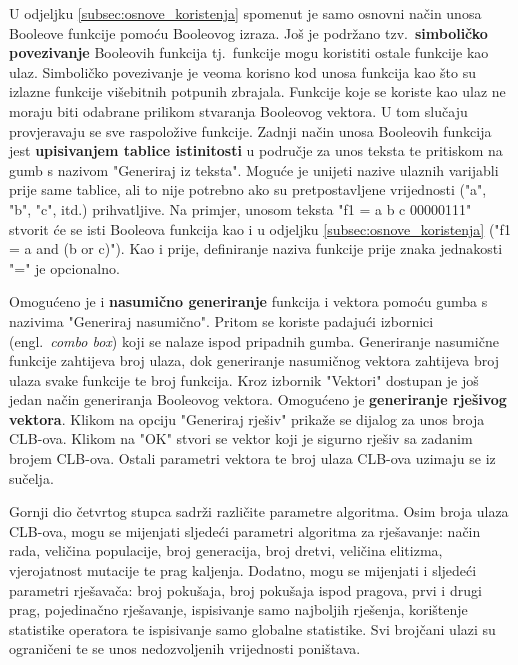 \documentclass[times, utf8, diplomski]{fer}
\begin{document}
U odjeljku \ref{subsec:osnove_koristenja} spomenut je samo osnovni način unosa Booleove funkcije pomoću Booleovog izraza. Još je podržano tzv.~\textbf{simboličko povezivanje} Booleovih funkcija tj.~funkcije mogu koristiti ostale funkcije kao ulaz. Simboličko povezivanje je veoma korisno kod unosa funkcija kao što su izlazne funkcije višebitnih potpunih zbrajala. Funkcije koje se koriste kao ulaz ne moraju biti odabrane prilikom stvaranja Booleovog vektora. U tom slučaju provjeravaju se sve raspoložive funkcije. Zadnji način unosa Booleovih funkcija jest \textbf{upisivanjem tablice istinitosti} u područje za unos teksta te pritiskom na gumb s nazivom "Generiraj iz teksta". Moguće je unijeti nazive ulaznih varijabli prije same tablice, ali to nije potrebno ako su pretpostavljene vrijednosti ("a", "b", "c", itd.) prihvatljive. Na primjer, unosom teksta "f1 = a b c 00000111" stvorit će se isti Booleova funkcija kao i u odjeljku \ref{subsec:osnove_koristenja} ("f1 = a and (b or c)"). Kao i prije, definiranje naziva funkcije prije znaka jednakosti "=" je opcionalno.

Omogućeno je i \textbf{nasumično generiranje} funkcija i vektora pomoću gumba s nazivima "Generiraj nasumično". Pritom se koriste padajući izbornici (engl.~\textit{combo box}) koji se nalaze ispod pripadnih gumba. Generiranje nasumične funkcije zahtijeva broj ulaza, dok generiranje nasumičnog vektora zahtijeva broj ulaza svake funkcije te broj funkcija. Kroz izbornik "Vektori" dostupan je još jedan način generiranja Booleovog vektora. Omogućeno je \textbf{generiranje rješivog vektora}. Klikom na opciju "Generiraj rješiv" prikaže se dijalog za unos broja CLB-ova. Klikom na "OK" stvori se vektor koji je sigurno rješiv sa zadanim brojem CLB-ova. Ostali parametri vektora te broj ulaza CLB-ova uzimaju se iz sučelja.

Gornji dio četvrtog stupca sadrži različite parametre algoritma. Osim broja ulaza CLB-ova, mogu se mijenjati sljedeći parametri algoritma za rješavanje: način rada, veličina populacije, broj generacija, broj dretvi, veličina elitizma, vjerojatnost mutacije te  prag kaljenja. Dodatno, mogu se mijenjati i sljedeći parametri rješavača: broj pokušaja, broj pokušaja ispod pragova, prvi i drugi prag, pojedinačno rješavanje, ispisivanje samo najboljih rješenja, korištenje statistike operatora te ispisivanje samo globalne statistike. Svi brojčani ulazi su ograničeni te se unos nedozvoljenih vrijednosti poništava.
\end{document}
